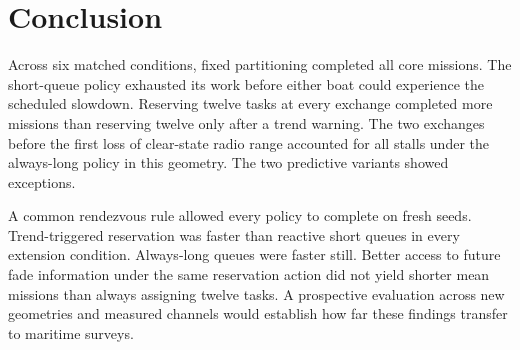 \section{Conclusion}
Across six matched conditions, fixed partitioning completed all core missions. The short-queue policy exhausted its work before either boat could experience the scheduled slowdown. Reserving twelve tasks at every exchange completed more missions than reserving twelve only after a trend warning. The two exchanges before the first loss of clear-state radio range accounted for all stalls under the always-long policy in this geometry. The two predictive variants showed exceptions.

A common rendezvous rule allowed every policy to complete on fresh seeds. Trend-triggered reservation was faster than reactive short queues in every extension condition. Always-long queues were faster still. Better access to future fade information under the same reservation action did not yield shorter mean missions than always assigning twelve tasks. A prospective evaluation across new geometries and measured channels would establish how far these findings transfer to maritime surveys.

